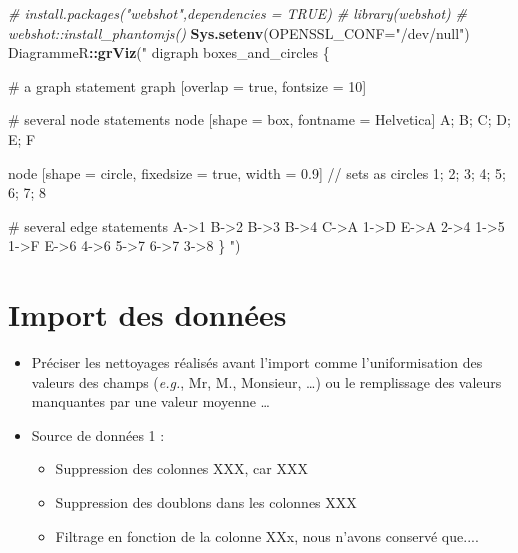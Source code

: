\documentclass[mstat,12pt]{unswthesis}
\newenvironment{Shaded}{\begin{snugshade}}{\end{snugshade}}
\newcommand{\AttributeTok}[1]{\textcolor[rgb]{0.13,0.29,0.53}{#1}}
\newcommand{\CommentTok}[1]{\textcolor[rgb]{0.56,0.35,0.01}{\textit{#1}}}
\newcommand{\FunctionTok}[1]{\textcolor[rgb]{0.13,0.29,0.53}{\textbf{#1}}}
\newcommand{\NormalTok}[1]{#1}
\newcommand{\SpecialCharTok}[1]{\textcolor[rgb]{0.81,0.36,0.00}{\textbf{#1}}}
\newcommand{\StringTok}[1]{\textcolor[rgb]{0.31,0.60,0.02}{#1}}
\begin{document}
\begin{Shaded}
\begin{Highlighting}[]
\CommentTok{\# install.packages("webshot",dependencies = TRUE)}
\CommentTok{\# library(webshot)}
\CommentTok{\# webshot::install\_phantomjs()}
\FunctionTok{Sys.setenv}\NormalTok{(}\AttributeTok{OPENSSL\_CONF=}\StringTok{"/dev/null"}\NormalTok{)}
\NormalTok{DiagrammeR}\SpecialCharTok{::}\FunctionTok{grViz}\NormalTok{(}\StringTok{"}
\StringTok{digraph boxes\_and\_circles \{}

\StringTok{  \# a \textquotesingle{}graph\textquotesingle{} statement}
\StringTok{  graph [overlap = true, fontsize = 10]}

\StringTok{  \# several \textquotesingle{}node\textquotesingle{} statements}
\StringTok{  node [shape = box,}
\StringTok{        fontname = Helvetica]}
\StringTok{  A; B; C; D; E; F}

\StringTok{  node [shape = circle,}
\StringTok{        fixedsize = true,}
\StringTok{        width = 0.9] // sets as circles}
\StringTok{  1; 2; 3; 4; 5; 6; 7; 8}

\StringTok{  \# several \textquotesingle{}edge\textquotesingle{} statements}
\StringTok{  A{-}\textgreater{}1 B{-}\textgreater{}2 B{-}\textgreater{}3 B{-}\textgreater{}4 C{-}\textgreater{}A}
\StringTok{  1{-}\textgreater{}D E{-}\textgreater{}A 2{-}\textgreater{}4 1{-}\textgreater{}5 1{-}\textgreater{}F}
\StringTok{  E{-}\textgreater{}6 4{-}\textgreater{}6 5{-}\textgreater{}7 6{-}\textgreater{}7 3{-}\textgreater{}8}
\StringTok{\}}
\StringTok{"}\NormalTok{)}
\end{Highlighting}
\end{Shaded}

\section{Import des données}\label{import-des-donnuxe9es}

\begin{itemize}
\tightlist
\item
  Préciser les nettoyages réalisés avant l'import comme l'uniformisation
  des valeurs des champs (\emph{e.g.}, Mr, M., Monsieur, \ldots) ou le
  remplissage des valeurs manquantes par une valeur moyenne \ldots{}
\end{itemize}

\begin{itemize}
    \item  Source de données 1 :
    \begin{itemize} 
     \item Suppression des colonnes XXX, car XXX
     \item  Suppression des doublons dans les colonnes XXX
    \item  Filtrage en fonction de la colonne XXx, nous n'avons conservé que.... 
\end{itemize}
\end{itemize}
\end{document}
